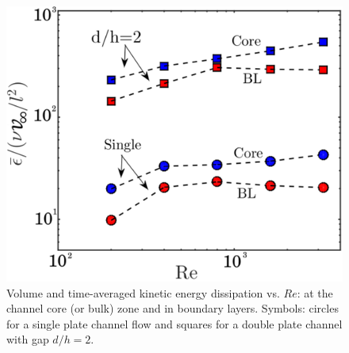 \documentclass[aps,pre,twocolumn,aps,longbibliography]{revtex4-1}
\begin{document}
	
	\begin{figure}
		\begin{minipage}[c]{1\linewidth}
			\includegraphics[width=0.95\linewidth]{Fig19.pdf} 
		\end{minipage} 
		\caption{Volume and time-averaged kinetic energy dissipation vs. $Re$: at the channel core (or bulk) zone and in boundary layers. Symbols: circles for a single plate channel flow and squares for a double plate channel with gap $d/h=2$.}
		\label{fig:core_BL_vs_Re} 
	\end{figure}
	
\end{document}

